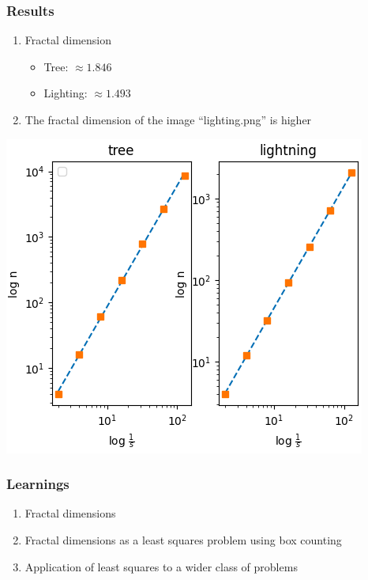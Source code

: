 \documentclass[10pt,aspectratio=169,handout]{beamer}
\begin{document}
\begin{frame}
    \frametitle{Results}

    \begin{minipage}{0.45\textwidth}
        \begin{enumerate}
            \item Fractal dimension\begin{itemize}
                      \item Tree: $\approx 1.846$
                      \item Lighting: $\approx1.493$
                  \end{itemize}
            \item The fractal dimension of the image ``lighting.png'' is higher
        \end{enumerate}
    \end{minipage}
    \begin{minipage}{0.45\textwidth}
        \includegraphics[scale=0.4]{images/plots.png}
    \end{minipage}
\end{frame}

\begin{frame}
    \frametitle{Learnings}
    \begin{enumerate}
        \item Fractal dimensions
        \item Fractal dimensions as a least squares problem using box counting
        \item Application of least squares to a wider class of problems
    \end{enumerate}
\end{frame}
\end{document}
